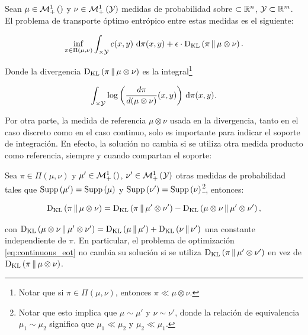 \begin{defn}
	Sean $\mu\in\mathcal{M}_+^1\left(\right)$ y $\nu\in\mathcal{M}_+^1\left(\mathcal{Y}\right)$ medidas de probabilidad sobre $\subset\mathbb{R}^n$, $\mathcal{Y}\subset\mathbb{R}^m$. El problema de transporte óptimo entrópico entre estas medidas es el siguiente:

	\begin{equation}
		\label{eq:continuous_eot}
		\inf_{\pi\in\Pi(\mu,\nu)}  \int_{\times\mathcal{Y}} c(x,y) \,\operatorname{d}\!\pi(x,y) + \epsilon\cdot \operatorname{D_{KL}}\left(\pi\,\|\,\mu\otimes\nu\right).
	\end{equation}

	Donde la divergencia $\operatorname{D_{KL}}\left(\pi\,\|\,\mu\otimes\nu\right)$ es la integral\footnote{Notar que si $\pi\in\Pi(\mu,\nu)$, entonces $\pi\ll\mu\otimes\nu$.}

	\begin{equation*}
		\int_{\times\mathcal{Y}} \log\left(\frac{d\pi}{d(\mu\otimes\nu)}(x,y)\right) \,\operatorname{d}\! \pi(x,y).
	\end{equation*}
\end{defn}

Por otra parte, la medida de referencia $\mu\otimes\nu$ usada en la divergencia, tanto en el caso discreto como en el caso continuo, solo es importante para indicar el soporte de integración. En efecto, la solución no cambia si se utiliza otra medida producto como referencia, siempre y cuando compartan el soporte:

\begin{prop}
	Sea $\pi\in\Pi(\mu,\nu)$ y $\mu'\in\mathcal{M}_+^1\left(\right)$, $\nu'\in\mathcal{M}_+^1\left(\mathcal{Y}\right)$ otras medidas de probabilidad tales que $\operatorname{Supp}\left(\mu'\right) = \operatorname{Supp}\left(\mu\right)$ y $\operatorname{Supp}\left(\nu'\right) = \operatorname{Supp}\left(\nu\right)$\footnote{Notar que esto implica que $\mu\sim\mu'$ y $\nu\sim\nu'$, donde la relación de equivalencia $\mu_1\sim\mu_2$ significa que $\mu_1\ll\mu_2$ y $\mu_2\ll\mu_1$.}, entonces:

	\begin{equation*}
		\operatorname{D_{KL}}\left(\pi\,\|\,\mu\otimes\nu\right) = \operatorname{D_{KL}}\left(\pi\,\|\,\mu'\otimes\nu'\right) - \operatorname{D_{KL}}\left(\mu\otimes\nu\,\|\,\mu'\otimes\nu'\right),
	\end{equation*}

	con $\operatorname{D_{KL}}\left(\mu\otimes\nu\,\|\,\mu'\otimes\nu'\right) = \operatorname{D_{KL}}\left(\mu\,\|\,\mu'\right) + \operatorname{D_{KL}}\left(\nu\,\|\,\nu'\right)$ una constante independiente de $\pi$. En particular, el problema de optimización \eqref{eq:continuous_eot} no cambia su solución si se utiliza $\operatorname{D_{KL}}\left(\pi\,\|\,\mu'\otimes\nu'\right)$ en vez de $\operatorname{D_{KL}}\left(\pi\,\|\,\mu\otimes\nu\right)$.
\end{prop}

